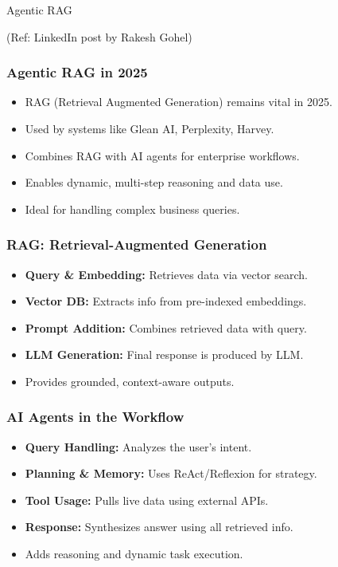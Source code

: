\begin{frame}[fragile]\frametitle{}
\begin{center}
{\Large Agentic RAG}

{\tiny (Ref: LinkedIn post by Rakesh Gohel)}

\end{center}
\end{frame}

\begin{frame}[fragile]\frametitle{Agentic RAG in 2025}
    \begin{itemize}
        \item RAG (Retrieval Augmented Generation) remains vital in 2025.
        \item Used by systems like Glean AI, Perplexity, Harvey.
        \item Combines RAG with AI agents for enterprise workflows.
        \item Enables dynamic, multi-step reasoning and data use.
        \item Ideal for handling complex business queries.
    \end{itemize}
\end{frame}

\begin{frame}[fragile]\frametitle{RAG: Retrieval-Augmented Generation}
    \begin{itemize}
        \item \textbf{Query \& Embedding:} Retrieves data via vector search.
        \item \textbf{Vector DB:} Extracts info from pre-indexed embeddings.
        \item \textbf{Prompt Addition:} Combines retrieved data with query.
        \item \textbf{LLM Generation:} Final response is produced by LLM.
        \item Provides grounded, context-aware outputs.
    \end{itemize}
\end{frame}

\begin{frame}[fragile]\frametitle{AI Agents in the Workflow}
    \begin{itemize}
        \item \textbf{Query Handling:} Analyzes the user’s intent.
        \item \textbf{Planning \& Memory:} Uses ReAct/Reflexion for strategy.
        \item \textbf{Tool Usage:} Pulls live data using external APIs.
        \item \textbf{Response:} Synthesizes answer using all retrieved info.
        \item Adds reasoning and dynamic task execution.
    \end{itemize}
\end{frame}

